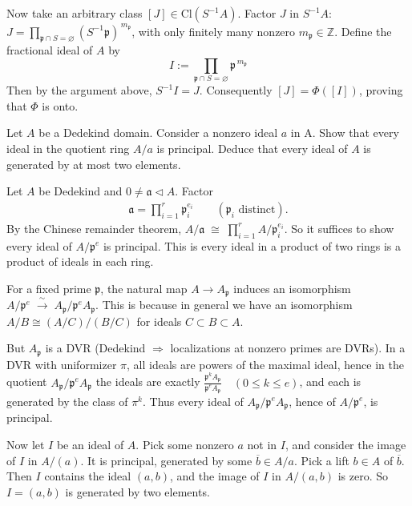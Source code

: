 \documentclass[12pt]{article}  %
\begin{document}
\begin{solution}
\begin{enumerate}
Now take an arbitrary class $[J]\in\mathrm{Cl}(S^{-1}A)$. Factor $J$ in $S^{-1}A$: $J=\prod_{\mathfrak p\cap S=\varnothing}(S^{-1}\mathfrak p)^{\,m_{\mathfrak p}}$, with only finitely many nonzero $m_{\mathfrak p}\in\mathbb Z$. Define the fractional ideal of $A$ by $$I:=\prod_{\mathfrak p\cap S=\varnothing}\mathfrak p^{\,m_{\mathfrak p}}$$ Then by the argument above, $S^{-1}I=J$. Consequently $[J]=\Phi([I])$, proving that $\Phi$ is onto.
    \end{enumerate}
\end{solution}

\begin{problem}{3}
Let $A$ be a Dedekind domain. Consider a nonzero ideal $a$ in A. Show that every ideal in the quotient ring $A/a$ is principal. Deduce that every ideal of $A$ is generated by at most two elements.
\end{problem}

\begin{solution}
    Let $A$ be Dedekind and $0\neq\mathfrak a\lhd A$. Factor \begin{align*}
         \mathfrak a=\prod_{i=1}^r \mathfrak p_i^{e_i}\qquad(\mathfrak p_i \text{ distinct}).
    \end{align*}
By the Chinese remainder theorem, $A/\mathfrak a \;\cong\; \prod_{i=1}^r A/\mathfrak p_i^{e_i}$. So it suffices to show every ideal of $A/\mathfrak p^{e}$ is principal. This is every ideal in a product of two rings is a product of ideals in each ring.

For a fixed prime $\mathfrak p$, the natural map $A\to A_{\mathfrak p}$ induces an isomorphism $A/\mathfrak p^{e}\;\xrightarrow{\ \sim\ }\;A_{\mathfrak p}/\mathfrak p^{e}A_{\mathfrak p}$. This is because in general we have an isomorphism $A/B \cong (A/C) / (B/C)$ for ideals $C\subset B\subset A$.

But $A_{\mathfrak p}$ is a DVR (Dedekind $\Rightarrow$ localizations at nonzero primes are DVRs). In a DVR with uniformizer $\pi$, all ideals are powers of the maximal ideal, hence in the quotient $A_{\mathfrak p}/\mathfrak p^{e}A_{\mathfrak p}$ the ideals are exactly $\frac{\mathfrak p^{k}A_{\mathfrak p}}{\mathfrak p^{e}A_{\mathfrak p}}\quad(0\le k\le e)$, and each is generated by the class of $\pi^{k}$. Thus every ideal of $A_{\mathfrak p}/\mathfrak p^{e}A_{\mathfrak p}$, hence of $A/\mathfrak p^{e}$, is principal. 

Now let $I$ be an ideal of $A$. Pick some nonzero $a$ not in $I$, and consider the image of $I$ in $A/(a)$. It is principal, generated by some $\overline{b}\in A/a$. Pick a lift $b \in A$ of $\overline{b}$. Then $I$ contains the ideal $(a,b)$, and the image of $I$ in $A/(a,b)$ is zero. So $I=(a,b)$ is generated by two elements.
\end{solution}
\end{document}
